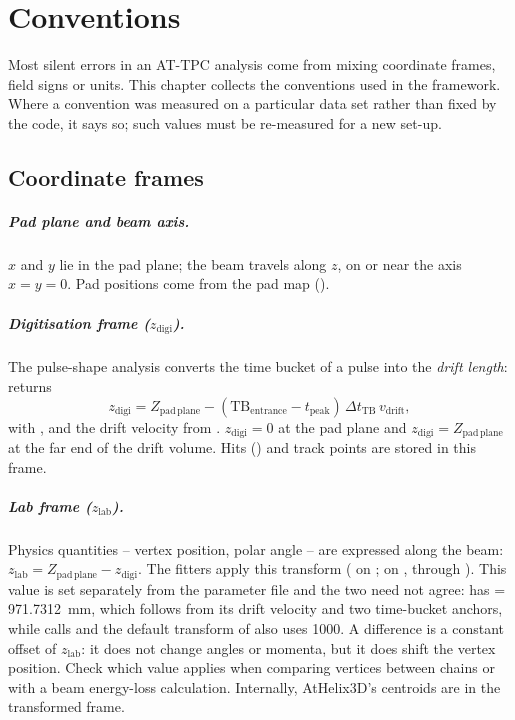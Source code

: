 \chapter{Conventions}
\label{ch:conventions}

Most silent errors in an AT-TPC analysis come from mixing coordinate frames, field signs or units. This chapter
collects the conventions used in the framework. Where a convention was measured on a particular data set rather
than fixed by the code, it says so; such values must be re-measured for a new set-up.

\section{Coordinate frames}

\paragraph{Pad plane and beam axis.} $x$ and $y$ lie in the pad plane; the beam travels along $z$, on or near the
axis $x = y = 0$. Pad positions come from the pad map ().

\paragraph{Digitisation frame ($z_\mathrm{digi}$).} The pulse-shape analysis converts the time bucket of a pulse into
the \emph{drift length}:  returns
\begin{equation}
  z_\mathrm{digi} = Z_\mathrm{pad\,plane} - (\mathrm{TB}_\mathrm{entrance} - t_\mathrm{peak})\,
  \Delta t_\mathrm{TB}\, v_\mathrm{drift},
\end{equation}
with ,  and the drift velocity from . $z_\mathrm{digi} = 0$ at the pad
plane and $z_\mathrm{digi} = Z_\mathrm{pad\,plane}$ at the far end of the drift volume. Hits () and track
points are stored in this frame.

\paragraph{Lab frame ($z_\mathrm{lab}$).} Physics quantities -- vertex position, polar angle -- are expressed along
the beam: $z_\mathrm{lab} = Z_\mathrm{pad\,plane} - z_\mathrm{digi}$. The fitters apply this transform
( on ;  on , through
). This value is set separately from the parameter file and the two need not agree:
 has  = 971.7312~mm, which follows from its drift velocity
and two time-bucket anchors, while  calls  and the
default transform of  also uses 1000. A difference is a constant offset of $z_\mathrm{lab}$: it does not
change angles or momenta, but it does shift the vertex position. Check which value applies when comparing vertices
between chains or with a beam energy-loss calculation. Internally, AtHelix3D's centroids are in the transformed frame.

